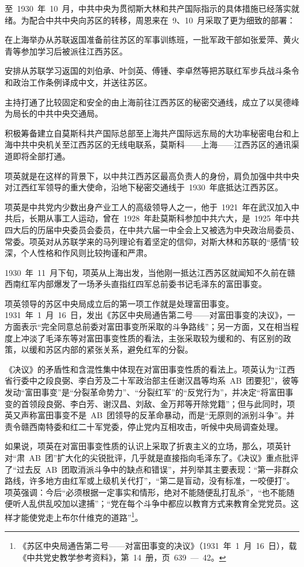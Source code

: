 至~1930~年~10~月，中共中央为贯彻斯大林和共产国际指示的具体措施已经落实就绪。为配合中共中央向苏区的转移，周恩来在~9、10~月采取了更为细致的部署：

在上海举办从苏联返国准备前往苏区的军事训练班，一批军政干部如张爱萍、黄火青等参加学习后被派往江西苏区。

安排从苏联学习返国的刘伯承、叶剑英、傅锺、李卓然等把苏联红军步兵战斗条令和政治工作条例译成中文，并送往苏区。

主持打通了比较固定和安全的由上海前往江西苏区的秘密交通线，成立了以吴德峰为局长的中共中央交通局。

积极筹备建立自莫斯科共产国际总部至上海共产国际远东局的大功率秘密电台和上海中共中央机关至江西苏区的无线电联系，莫斯科——上海——江西苏区的通讯渠道即将全部打通。

项英就是在这样的背景下，以中共江西苏区最高负责人的身份，肩负加强中共中央对江西红军领导的重大使命，沿地下秘密交通线于~1930~年底抵达江西苏区。

项英是中共党内少数出身产业工人的高级领导人之一，他于~1921~年在武汉加入中共后，长期从事工人运动，曾在~1928~年赴莫斯科参加中共六大，是~1925~年中共四大后的历届中央委员会委员，在中共六届一中全会上又被选为中央政治局委员、常委。项英对从苏联学来的马列理论有着坚定的信仰，对斯大林和苏联的“感情”较深，个人性格和作风则比较拘谨和严肃。

1930~年~11~月下旬，项英从上海出发，当他刚一抵达江西苏区就闻知不久前在赣西南红军内部爆发了一场矛头直指红四军总前委书记毛泽东的富田事变。

项英领导的苏区中央局成立后的第一项工作就是处理富田事变。1931~年~1~月~16~日，发出《苏区中央局通告第二号——对富田事变的决议》，一方面表示“完全同意总前委对富田事变所采取的斗争路线”；另一方面，又在相当程度上冲淡了毛泽东等对富田事变性质的看法，主张采取较为缓和的、有区别的政策，以缓和苏区内部的紧张关系，避免红军的分裂。

《决议》的矛盾性和含混性集中体现在对富田事变性质的看法上。项英认为“江西省行委中之段良弼、李白芳及二十军政治部主任谢汉昌等均系~AB~团要犯”，彼等发动“富田事变”是“分裂革命势力”、“分裂红军”的“反党行为”，并决定“将富田事变的首领段良弼、李白芳、谢汉昌、刘敌、金万邦等开除党籍”；但与此同时，项英又声称富田事变不是~AB~团领导的反革命暴动，而是“无原则的派别斗争”。并责令赣西南特委和红二十军党委，停止党内互相攻击，听候中央局调查处理。

如果说，项英在对富田事变性质的认识上采取了折衷主义的立场，那么，项英针对“肃~AB~团”扩大化的尖锐批评，几乎就是直接指向毛泽东了。《决议》重点批评了“过去反~AB~团取消派斗争中的缺点和错误”，并列举其主要表现：“第一非群众路线，许多地方由红军或上级机关代打”，“第二是盲动，没有标准，一咬便打”。项英强调：今后“必须根据一定事实和情形，绝对不能随便乱打乱杀”，“也不能随便听人乱供乱咬加以逮捕”；“党在每个斗争中都应以教育方式来教育全党党员。这样才能使党走上布尔什维克的道路”\footnote{《苏区中央局通告第二号——对富田事变的决议》（1931~年~1~月~16~日），载《中共党史教学参考资料》，第~14~册，页~639~—~42。}。

